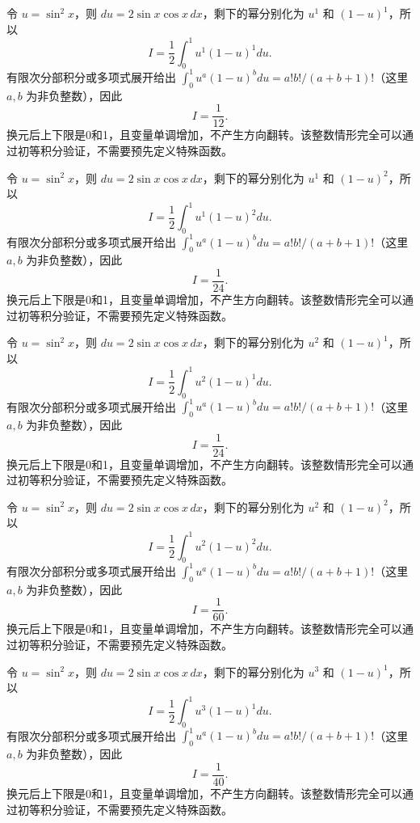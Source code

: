 \documentclass[12pt,fontset=fandol]{ctexart}
\begin{document}
\begin{solve}\label{ans:c16q19}
令 $u=\sin^2x$，则 $du=2\sin x\cos x\,dx$，剩下的幂分别化为 $u^{1}$ 和 $(1-u)^{1}$，所以
\[
I=\frac12\int_0^1u^{1}(1-u)^{1}du.
\]
有限次分部积分或多项式展开给出 $\int_0^1u^a(1-u)^bdu=a!b!/(a+b+1)!$（这里 $a,b$ 为非负整数），因此
\[
I=\frac{1}{12}.
\]
换元后上下限是0和1，且变量单调增加，不产生方向翻转。该整数情形完全可以通过初等积分验证，不需要预先定义特殊函数。
\end{solve}

\begin{solve}\label{ans:c16q20}
令 $u=\sin^2x$，则 $du=2\sin x\cos x\,dx$，剩下的幂分别化为 $u^{1}$ 和 $(1-u)^{2}$，所以
\[
I=\frac12\int_0^1u^{1}(1-u)^{2}du.
\]
有限次分部积分或多项式展开给出 $\int_0^1u^a(1-u)^bdu=a!b!/(a+b+1)!$（这里 $a,b$ 为非负整数），因此
\[
I=\frac{1}{24}.
\]
换元后上下限是0和1，且变量单调增加，不产生方向翻转。该整数情形完全可以通过初等积分验证，不需要预先定义特殊函数。
\end{solve}

\begin{solve}\label{ans:c16q21}
令 $u=\sin^2x$，则 $du=2\sin x\cos x\,dx$，剩下的幂分别化为 $u^{2}$ 和 $(1-u)^{1}$，所以
\[
I=\frac12\int_0^1u^{2}(1-u)^{1}du.
\]
有限次分部积分或多项式展开给出 $\int_0^1u^a(1-u)^bdu=a!b!/(a+b+1)!$（这里 $a,b$ 为非负整数），因此
\[
I=\frac{1}{24}.
\]
换元后上下限是0和1，且变量单调增加，不产生方向翻转。该整数情形完全可以通过初等积分验证，不需要预先定义特殊函数。
\end{solve}

\begin{solve}\label{ans:c16q22}
令 $u=\sin^2x$，则 $du=2\sin x\cos x\,dx$，剩下的幂分别化为 $u^{2}$ 和 $(1-u)^{2}$，所以
\[
I=\frac12\int_0^1u^{2}(1-u)^{2}du.
\]
有限次分部积分或多项式展开给出 $\int_0^1u^a(1-u)^bdu=a!b!/(a+b+1)!$（这里 $a,b$ 为非负整数），因此
\[
I=\frac{1}{60}.
\]
换元后上下限是0和1，且变量单调增加，不产生方向翻转。该整数情形完全可以通过初等积分验证，不需要预先定义特殊函数。
\end{solve}

\begin{solve}\label{ans:c16q23}
令 $u=\sin^2x$，则 $du=2\sin x\cos x\,dx$，剩下的幂分别化为 $u^{3}$ 和 $(1-u)^{1}$，所以
\[
I=\frac12\int_0^1u^{3}(1-u)^{1}du.
\]
有限次分部积分或多项式展开给出 $\int_0^1u^a(1-u)^bdu=a!b!/(a+b+1)!$（这里 $a,b$ 为非负整数），因此
\[
I=\frac{1}{40}.
\]
换元后上下限是0和1，且变量单调增加，不产生方向翻转。该整数情形完全可以通过初等积分验证，不需要预先定义特殊函数。
\end{solve}
\end{document}

